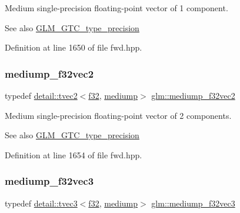Medium single-\/precision floating-\/point vector of 1 component. \begin{DoxySeeAlso}{See also}
\hyperlink{group__gtc__type__precision}{G\+L\+M\+\_\+\+G\+T\+C\+\_\+type\+\_\+precision} 
\end{DoxySeeAlso}


Definition at line 1650 of file fwd.\+hpp.

\mbox{\label{group__gtc__type__precision_gaf53d380f948fdbb540eab960f2ad4b58}} 
\subsubsection{\texorpdfstring{mediump\+\_\+f32vec2}{mediump\_f32vec2}}
{\footnotesize\ttfamily typedef \hyperlink{structglm_1_1detail_1_1tvec2}{detail\+::tvec2}$<$\hyperlink{group__gtc__type__precision_ga0ec999b57f5330d9021256e96038df04}{f32}, \hyperlink{namespaceglm_a0f04f086094c747d227af4425893f545a6416f3ea0c9025fb21ed50c4d6620482}{mediump}$>$ \hyperlink{group__gtc__type__precision_gaf53d380f948fdbb540eab960f2ad4b58}{glm\+::mediump\+\_\+f32vec2}}

Medium single-\/precision floating-\/point vector of 2 components. \begin{DoxySeeAlso}{See also}
\hyperlink{group__gtc__type__precision}{G\+L\+M\+\_\+\+G\+T\+C\+\_\+type\+\_\+precision} 
\end{DoxySeeAlso}


Definition at line 1654 of file fwd.\+hpp.

\mbox{\label{group__gtc__type__precision_gada8879dd10f28428e2eb1ae62f643f65}} 
\subsubsection{\texorpdfstring{mediump\+\_\+f32vec3}{mediump\_f32vec3}}
{\footnotesize\ttfamily typedef \hyperlink{structglm_1_1detail_1_1tvec3}{detail\+::tvec3}$<$\hyperlink{group__gtc__type__precision_ga0ec999b57f5330d9021256e96038df04}{f32}, \hyperlink{namespaceglm_a0f04f086094c747d227af4425893f545a6416f3ea0c9025fb21ed50c4d6620482}{mediump}$>$ \hyperlink{group__gtc__type__precision_gada8879dd10f28428e2eb1ae62f643f65}{glm\+::mediump\+\_\+f32vec3}}

